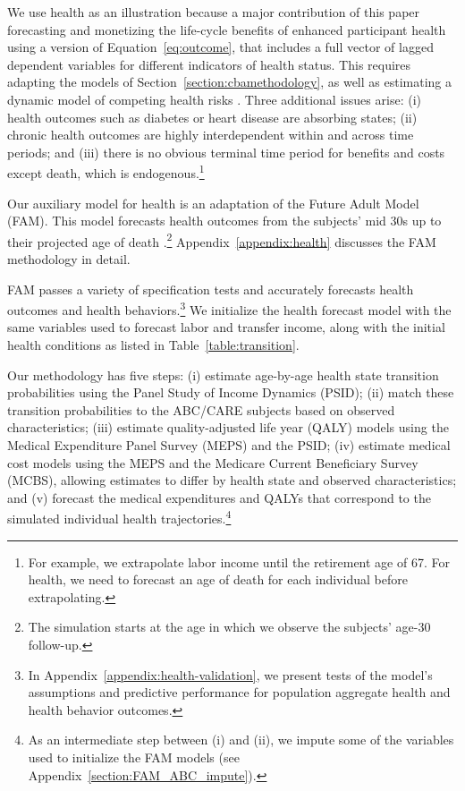 We use health as an illustration because a major contribution of this paper forecasting and monetizing the life-cycle benefits of enhanced participant health using a version of Equation~\eqref{eq:outcome}, that includes a full vector of lagged dependent variables for different indicators of health status. This requires adapting the models of Section~\ref{section:cbamethodology}, as well as estimating a dynamic model of competing health risks \citep{Kalbfleisch_Prentice_1980_failure}. Three additional issues arise: (i) health outcomes such as diabetes or heart disease are absorbing states; (ii) chronic health outcomes are highly interdependent within and across time periods; and (iii) there is no obvious terminal time period for benefits and costs except death, which is endogenous.\footnote{For example, we extrapolate labor income until the retirement age of 67. For health, we need to forecast an age of death for each individual before extrapolating.}

Our auxiliary model for health is an adaptation of the Future Adult Model (FAM). This model forecasts health outcomes from the subjects' mid 30s up to their projected age of death \citep{Goldman_etal_2015_Future-Elderly-Model-Report}.\footnote{The simulation starts at the age in which we observe the subjects' age-30 follow-up.}  Appendix~\ref{appendix:health} discusses the FAM methodology in detail.

FAM passes a variety of specification tests and accurately forecasts health outcomes and health behaviors.\footnote{In Appendix~\ref{appendix:health-validation}, we present tests of the model's assumptions and predictive performance for population aggregate health and health behavior outcomes.} We initialize the health forecast model with the same variables used to forecast labor and transfer income, along with the initial health conditions as listed in Table~\ref{table:transition}.

Our methodology has five steps: (i) estimate age-by-age health state transition probabilities using the Panel Study of Income Dynamics (PSID); (ii) match these transition probabilities to the ABC/CARE subjects based on observed characteristics; (iii) estimate quality-adjusted life year (QALY) models using the Medical Expenditure Panel Survey (MEPS) and the PSID; (iv) estimate medical cost models using the MEPS and the Medicare Current Beneficiary Survey (MCBS), allowing estimates to differ by health state and observed characteristics; and (v) forecast the medical expenditures and QALYs that correspond to the simulated individual health trajectories.\footnote{As an intermediate step between (i) and (ii), we impute some of the variables used to initialize the FAM models (see  Appendix~\ref{section:FAM_ABC_impute}).}

